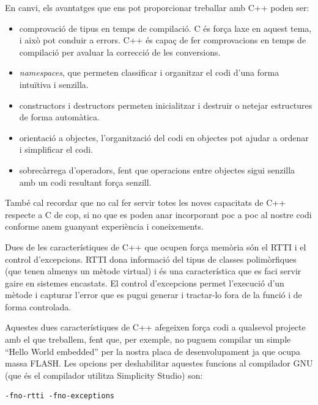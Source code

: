 En canvi, els avantatges que ens pot proporcionar treballar amb C++ poden ser:
\begin{itemize}
 \item comprovació de tipus en temps de compilació. C és força laxe en aquest tema, i això pot conduir a errors. C++ és capaç de fer comprovacions en temps de compilació per avaluar la correcció de les conversions.
 \item {\em namespaces}, que permeten classificar i organitzar el codi d'una forma intuïtiva i senzilla.
 \item constructors i destructors permeten inicialitzar i destruir o netejar estructures de forma automàtica.
 \item orientació a objectes, l'organització del codi en objectes pot ajudar a ordenar i simplificar el codi.
 \item sobrecàrrega d'operadors, fent que operacions entre objectes sigui senzilla amb un codi resultant força senzill.
\end{itemize}

També cal recordar que no cal fer servir totes les noves capacitats de C++ respecte a C de cop, si no que es poden anar incorporant poc a poc al nostre codi conforme anem guanyant experiència i coneixements.

Dues de les característiques de C++ que ocupen força memòria són el \gls{RTTI} i el control d'excepcions. RTTI dona informació del tipus de classes polimòrfiques (que tenen almenys un mètode virtual) i és una característica que es faci servir gaire en sistemes encastats. El control d'excepcions permet l'execució d'un mètode i capturar l'error que es pugui generar i tractar-lo fora de la funció i de forma controlada.

Aquestes dues característiques de C++ afegeixen força codi a qualsevol projecte amb el que treballem, fent que, per exemple, no puguem compilar un simple ``Hello World embedded'' per la nostra placa de desenvolupament ja que ocupa massa FLASH. Les opcions per deshabilitar aquestes funcions al compilador GNU (que és el compilador utilitza Simplicity Studio) son:
\begin{verbatim}
-fno-rtti -fno-exceptions
\end{verbatim}

